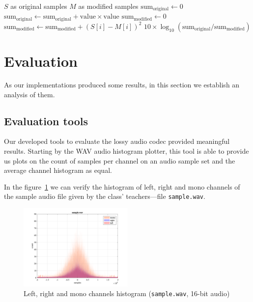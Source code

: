 \documentclass[conference]{IEEEtran}
\begin{document}
\begin{algorithmic}[1]
	\REQUIRE $S$ as original samples \AND $M$ as modified samples
	\STATE $\text{sum}_{\text{original}} \leftarrow 0$
		\STATE $\text{sum}_{\text{original}} \leftarrow \text{sum}_{\text{original}} + \text{value}\times \text{value}$
	\ENDFOR
	\STATE $\text{sum}_{\text{modified}} \leftarrow 0$	
		\STATE $\text{sum}_{\text{modified}} \leftarrow \text{sum}_{\text{modified}}+\left(S\left[i\right] - M\left[i\right]\right)^2$
	\ENDFOR
	\RETURN $10\times\log_{10}{\left(\text{sum}_{\text{original}}/\text{sum}_{\text{modified}}\right)}$
\end{algorithmic}

\section{Evaluation}

As our implementations produced some results, in this section we establish an analysis of them.

\subsection{Evaluation tools}

Our developed tools to evaluate the lossy audio codec provided meaningful results. Starting by the \ac{WAV} audio histogram plotter, this tool is able to provide us plots on the count of samples per channel on an audio sample set and the average channel histogram as equal.

In the figure~\ref{fig:sample-hist} we can verify the histogram of left, right and mono channels of the sample audio file given by the class' teachers—file \texttt{sample.wav}. 

\begin{figure}
	\centering
	\includegraphics[width=0.5\textwidth]{figs/original-hist.png}
	\caption{Left, right and mono channels histogram (\texttt{sample.wav}, 16-bit audio)}
    \label{fig:sample-hist}
\end{figure}
\end{document}
